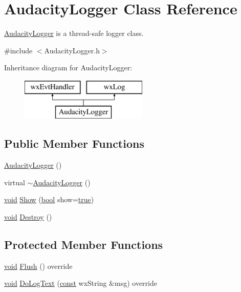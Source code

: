\hypertarget{class_audacity_logger}{}\section{Audacity\+Logger Class Reference}
\label{class_audacity_logger}


\hyperlink{class_audacity_logger}{Audacity\+Logger} is a thread-\/safe logger class.  




{\ttfamily \#include $<$Audacity\+Logger.\+h$>$}

Inheritance diagram for Audacity\+Logger\+:\begin{figure}[H]
\begin{center}
\leavevmode
\includegraphics[height=2.000000cm]{class_audacity_logger}
\end{center}
\end{figure}
\subsection*{Public Member Functions}
\begin{DoxyCompactItemize}
\item 
\hyperlink{class_audacity_logger_aa0a9a281de151109c6ed7d64cdda3b47}{Audacity\+Logger} ()
\item 
virtual \hyperlink{class_audacity_logger_a636a79d32ba47cc50e2e32d71cddcdc7}{$\sim$\+Audacity\+Logger} ()
\item 
\hyperlink{sound_8c_ae35f5844602719cf66324f4de2a658b3}{void} \hyperlink{class_audacity_logger_a86092af1c74ee1c7404642c941530d11}{Show} (\hyperlink{mac_2config_2i386_2lib-src_2libsoxr_2soxr-config_8h_abb452686968e48b67397da5f97445f5b}{bool} show=\hyperlink{mac_2config_2i386_2lib-src_2libsoxr_2soxr-config_8h_a41f9c5fb8b08eb5dc3edce4dcb37fee7}{true})
\item 
\hyperlink{sound_8c_ae35f5844602719cf66324f4de2a658b3}{void} \hyperlink{class_audacity_logger_a21524b2990acafae028a4b0b40fe023c}{Destroy} ()
\end{DoxyCompactItemize}
\subsection*{Protected Member Functions}
\begin{DoxyCompactItemize}
\item 
\hyperlink{sound_8c_ae35f5844602719cf66324f4de2a658b3}{void} \hyperlink{class_audacity_logger_a6996b2f9e7873502ca4cd425228531b4}{Flush} () override
\item 
\hyperlink{sound_8c_ae35f5844602719cf66324f4de2a658b3}{void} \hyperlink{class_audacity_logger_af972b7de47d9071e19cc3f1129522f6d}{Do\+Log\+Text} (\hyperlink{getopt1_8c_a2c212835823e3c54a8ab6d95c652660e}{const} wx\+String \&msg) override
\end{DoxyCompactItemize}



